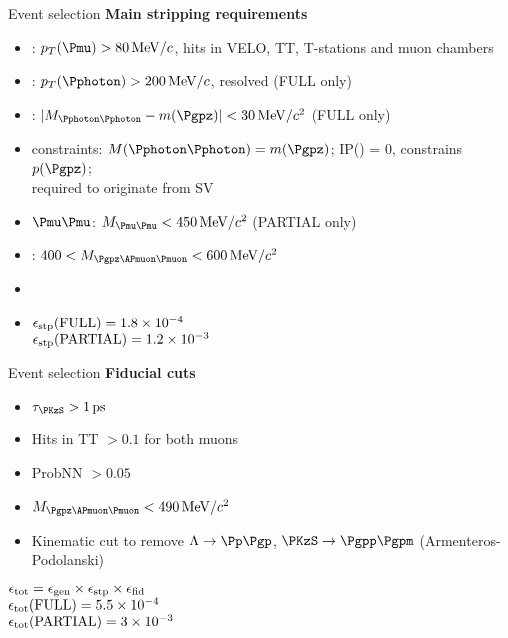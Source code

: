 \documentclass[9pt,hyperref={unicode},utf8]{beamer}
\begin{document}
\begin{frame}{Event selection}
 \textbf{Main stripping requirements}
 \vspace{0.2cm}
 \begin{itemize}
  \setlength\itemsep{0.8em}
  \item \Pmu: $p_{T}(\Pmu)>\SI{80}{\mega\eV}/c$, hits in VELO, TT, T-stations and muon chambers
  \item \Pphoton: $p_{T}(\Pphoton)>\SI{200}{\mega\eV}/c$, resolved (FULL only)
  \item \Pgpz: $|M_{\Pphoton\Pphoton}-m(\Pgpz)|<\SI{30}{\mega\eV}/c^{2}$ (FULL only)        
  \item[] \Pgpz constraints: $M(\Pphoton\Pphoton) = m(\Pgpz)$; IP(\PKzS) = 0, constrains $p(\Pgpz)$; \\ \hspace{2.1cm} \Pgpz required to originate from SV
  \item $\Pmu\Pmu$: $M_{\Pmu\Pmu} < \SI{450}{\mega\eV}/c^{2}$ (PARTIAL only)
  \item \PKzS: $400 < M_{\Pgpz\APmuon\Pmuon} < \SI{600}{\mega\eV}/c^{2}$
  \item[]
  \item $\epsilon_{\rm stp}(\rm FULL) = 1.8\times10^{-4}$\\ $\epsilon_{\rm stp}(\rm PARTIAL) = 1.2\times10^{-3}$
 \end{itemize}
\end{frame}
 
\begin{frame}{Event selection}
  \textbf{Fiducial cuts}
 \vspace{0.2cm}	
  \begin{itemize}
  \setlength\itemsep{0.8em}
    \item $\tau_{\PKzS}>\SI{1}{\pico\s}$
    \item Hits in TT $>0.1$ for both muons
    \item ProbNN $>0.05$
    \item $M_{\Pgpz\APmuon\Pmuon} < \SI{490}{\mega\eV}/c^{2}$
    \item Kinematic cut to remove $\Lambda\to\Pp\Pgp$, $\PKzS\to\Pgpp\Pgpm$ (Armenteros-Podolanski)
  \end{itemize}
  
  \vspace{0.5cm}
  
  \centering
  \begin{minipage}{0.5\textwidth}
    \begin{framed}
    $\epsilon_{\rm tot} = \epsilon_{\rm gen}\times\epsilon_{\rm stp}\times\epsilon_{\rm fid}$\\
    $\epsilon_{\rm tot}(\rm FULL) = 5.5\times10^{-4}$\\
    $\epsilon_{\rm tot}(\rm PARTIAL) = 3\times10^{-3}$
    \end{framed}
  \end{minipage}
\end{frame}
\end{document}
